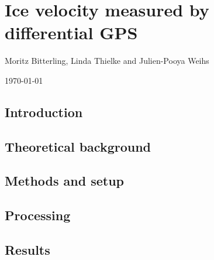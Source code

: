 

\renewcommand{\chapterauthor}{Moritz Bitterling, Linda Thielke and Julien-Pooya Weihs}
\chapter{Ice velocity measured by differential GPS}
\label{gpsmeas}
\begin{center}
\chapterauthor

\today
\end{center}


\begin{abstract}

\end{abstract}


\section{Introduction}


\section{Theoretical background} \label{GPS:sec:Theoretical backround}


\section{Methods and setup} \label{GPS:sec:Methods and setup}


\section{Processing} \label{GPS:sec:Processing}


\section{Results} \label{GPS:sec:Results}


